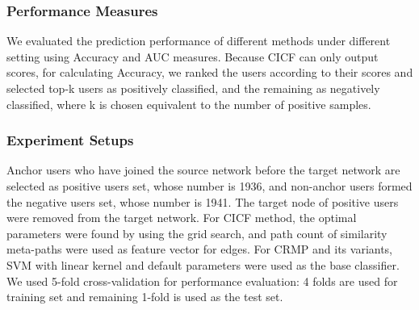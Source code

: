 \documentclass[conference]{IEEEtran}
\begin{document}
\subsubsection{Performance Measures}
We evaluated the prediction performance of different methods under different setting using Accuracy and AUC measures. Because CICF can only output scores, for calculating Accuracy, we ranked the users according to their scores and selected top-k users as positively classified, and the remaining as negatively classified, where k is chosen equivalent to the number of positive samples.

\subsubsection{Experiment Setups}
Anchor users who have joined the source network before the target network are selected as positive users set, whose number is 1936, and non-anchor users formed the negative users set, whose number is 1941. The target node of positive users were removed from the target network. For CICF method, the optimal parameters were found by using the grid search, and path count of similarity meta-paths were used as feature vector for edges. For CRMP and its variants, SVM with linear kernel and default parameters were used as the base classifier. We used 5-fold cross-validation for performance evaluation: 4 folds are used for training set and remaining 1-fold is used as the test set.

\newcommand{\targetplot}[2]{
\begin{tikzpicture}
\begin{axis}
[
tiny,
width=1.9in,
legend style={at={(0.5,1.31)},
/tikz/every even column/.append style={column sep=0.2cm},
      anchor=north,legend columns=2, draw=none},
legend cell align=center,
ymin=0.45,ymax=#2,
xmin=0.0,xmax=0.9,
xtick={0.1, 0.2, 0.3, 0.4, 0.5, 0.6, 0.7, 0.8},
xmajorgrids,
ymajorgrids,
y tick label style={
    /pgf/number format/.cd,
        fixed,
        fixed zerofill,
        precision=2,
    /tikz/.cd
},
legend entries={CICF, CRMP, RMP},
]
\addplot[color=darkgray,thick,error bars/.cd,y dir=both,y explicit,] table[y error=e] {results/target-#1-cicf-ht.dat};
\addplot[color=cyan,thick,error bars/.cd,y dir=both,y explicit,] table[y error=e] {results/target-#1-crmp-ht.dat};
\addplot[color=orange,thick,error bars/.cd,y dir=both,y explicit,] table[y error=e] {results/target-#1-rmp-ht.dat};
\end{axis}
\end{tikzpicture}
}
\end{document}
